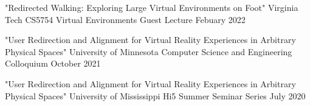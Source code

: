 
\begin{cventries}

  \cventry
    {"Redirected Walking: Exploring Large Virtual Environments on Foot"} %
    {Virginia Tech CS5754 Virtual Environments Guest Lecture} %
    {Febuary 2022} %
    {} %
    {}
    \vspace{-0.15in}

  \cventry
    {"User Redirection and Alignment for Virtual Reality Experiences in Arbitrary Physical Spaces"} %
    {University of Minnesota Computer Science and Engineering Colloquium} %
    {October 2021} %
    {} %
    {}
    \vspace{-0.15in}
    
  \cventry
    {"User Redirection and Alignment for Virtual Reality Experiences in Arbitrary Physical Spaces"} %
    {University of Mississippi Hi5 Summer Seminar Series} %
    {July 2020} %
    {} %
    {}
    \vspace{-0.15in}
\end{cventries}

